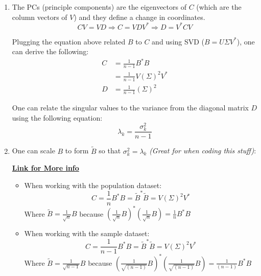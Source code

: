 \documentclass[11.5pt,a4paper]{article}
\begin{document}
\begin{itemize}
\begin{enumerate}
        \item The PCs (principle components) are the eigenvectors of $C$ (which are the column vectors of $V$) and they define a change in coordinates.
        \begin{equation*}
            CV = VD \Rightarrow C = VDV^* \Rightarrow D = V^*CV
        \end{equation*}

        Plugging the equation above related $B$ to $C$ and using SVD ($B = U\Sigma V^*$), one can derive the following:
        \begin{align*}
            C &= \frac{1}{n-1}B^*B \\
            &= \frac{1}{n-1}V\left(\Sigma \right)^2V^* \\
            D &= \frac{1}{n-1}\left(\Sigma \right)^2
        \end{align*}

        One can relate the singular values to the variance from the diagonal matrix $D$ using the following equation:
        \begin{equation*}
            \lambda_k = \frac{\sigma_k^2}{n-1}
        \end{equation*}

        \item One can scale $B$ to form $\tilde{B}$ so that $\sigma_k^2 = \lambda_k$ \textit{(Great for when coding this stuff)}:

        \href{https://chatgpt.com/c/68338638-bfb4-800a-9865-2d47ea8773f7}{\textbf{Link for More info}}
        \begin{itemize}
            \item When working with the population dataset:
            \begin{equation*}
                C = \frac{1}{n}B^*B = \tilde{B}^*\tilde{B} = V(\Sigma)^2V^*
            \end{equation*}
            Where $\tilde{B} = \frac{1}{\sqrt{n}}B$ because $\left(\frac{1}{\sqrt{n}}B\right)^*\left(\frac{1}{\sqrt{n}}B\right) = \frac{1}{n}B^*B$
            \item When working with the sample dataset:
            \begin{equation*}
                C = \frac{1}{n-1}B^*B = \tilde{B}^*\tilde{B} = V(\Sigma)^2V^*
            \end{equation*}
            Where $\tilde{B} = \frac{1}{\sqrt{n-1}}B$ because $\left(\frac{1}{\sqrt{(n-1)}}B\right)^*\left(\frac{1}{\sqrt{(n-1)}}B\right) = \frac{1}{(n-1)}B^*B$
        \end{itemize}



\end{enumerate}
\end{itemize}
\end{document}
